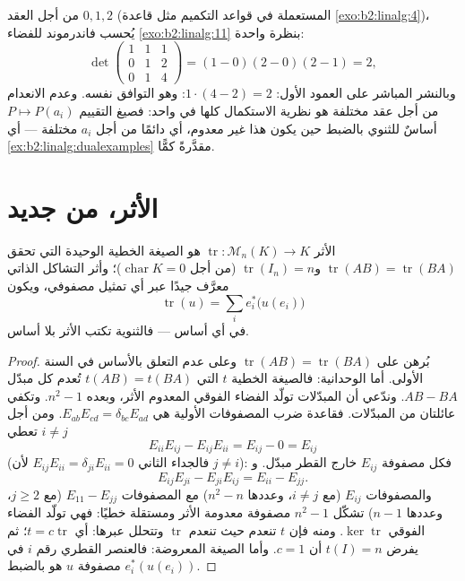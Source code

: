 \begin{example}\label{ex:b2:linalg:vandermondework}
من أجل العقد $0, 1, 2$ (المستعملة في قواعد التكميم مثل
قاعدة \cref{exo:b2:linalg:4})، يُحسب  فاندرموند للفضاء
\cref{exo:b2:linalg:11} بنظرة واحدة:
\[
\det\begin{pmatrix}
1 & 1 & 1\\
0 & 1 & 2\\
0 & 1 & 4
\end{pmatrix}
= (1 - 0)(2 - 0)(2 - 1) = 2 ,
\]
وبالنشر المباشر على العمود الأول: $1\cdot(4 - 2)
= 2$: وهو التوافق نفسه. وعدم الانعدام من أجل عقد مختلفة هو
نظرية الاستكمال كلها في  واحد: فصيغ التقييم
$P \mapsto P(a_i)$ أساسٌ للثنوي بالضبط حين يكون هذا 
غير معدوم، أي دائمًا من أجل $a_i$ مختلفة
--- أي \cref{ex:b2:linalg:dualexamples} مقدَّرةً كمًّا.
\end{example}

\section{الأثر، من جديد}

\begin{proposition}\label{prop:b2:linalg:trace}
الأثر $\operatorname{tr} \colon \mathcal{M}_n(K) \to K$ هو الصيغة الخطية
الوحيدة التي تحقق $\operatorname{tr}(AB) =
\operatorname{tr}(BA)$ و$\operatorname{tr}(I_n) = n$ (من أجل
$\operatorname{char} K = 0$)؛ وأثر التشاكل الذاتي معرَّف جيدًا
عبر أي تمثيل مصفوفي، ويكون
\[
\operatorname{tr}(u) = \sum_{i} e_i^*\bigl(u(e_i)\bigr)
\]
في أي أساس --- فالثنوية تكتب الأثر بلا أساس.
\end{proposition}

\begin{proof}
بُرهن على $\operatorname{tr}(AB) = \operatorname{tr}(BA)$ وعلى عدم التعلق
بالأساس في السنة الأولى. أما الوحدانية: فالصيغة الخطية $t$ التي $t(AB) =
t(BA)$ تُعدم كل مبدّل $AB - BA$. وندّعي أن المبدّلات
تولّد الفضاء الفوقي المعدوم الأثر، وبعده $n^2 - 1$. وتكفي
عائلتان من المبدّلات. فقاعدة ضرب المصفوفات الأولية هي
$E_{ab}E_{cd} = \delta_{bc}E_{ad}$. ومن أجل
$i \neq j$ تعطي
\[
E_{ii}E_{ij} - E_{ij}E_{ii} = E_{ij} - 0 = E_{ij}
\]
(فالجداء الثاني $E_{ij}E_{ii} = \delta_{ji}E_{ii} = 0$
لأن $j \neq i$): فكل مصفوفة $E_{ij}$ خارج القطر مبدّل.
و
\[
E_{ij}E_{ji} - E_{ji}E_{ij} = E_{ii} - E_{jj} .
\]
والمصفوفات $E_{ij}$ (مع $i \neq j$، وعددها $n^2 - n$) مع المصفوفات
$E_{11} - E_{jj}$ (مع $j \geq 2$، وعددها $n - 1$) تشكّل $n^2 - 1$
مصفوفة معدومة الأثر ومستقلة خطيًا: فهي تولّد
الفضاء الفوقي $\ker\operatorname{tr}$. ومنه فإن $t$ تنعدم حيث تنعدم
$\operatorname{tr}$ وتتحلل عبرها: أي $t =
c\operatorname{tr}$؛ ثم يفرض $t(I) = n$ أن $c = 1$. وأما الصيغة المعروضة:
فالعنصر القطري رقم $i$ في مصفوفة $u$ هو بالضبط
$e_i^*(u(e_i))$.
\end{proof}

